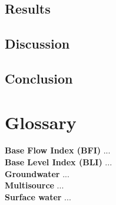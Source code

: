 \documentclass[DIV=calc, paper=a4, fontsize=11pt, twocolumn]{scrartcl}	 %
\begin{document}
	\subsection{Results}	
	\subsection{Discussion}
	\subsection{Conclusion}
	
\section{Glossary}	
\textbf{Base Flow Index (BFI)} ...\\
\textbf{Base Level Index (BLI)} ...\\
\textbf{Groundwater} ...\\
\textbf{Multisource} ...\\
\textbf{Surface water} ...\\

{}


%

\end{document}
